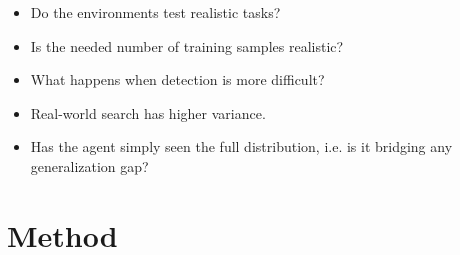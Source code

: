 \begin{itemize}
    \item Do the environments test realistic tasks?
    \item Is the needed number of training samples realistic?
    \item What happens when detection is more difficult?
    \item Real-world search has higher variance.
    \item Has the agent simply seen the full distribution, i.e. is it bridging any generalization gap?
\end{itemize}

\section{Method}
\label{sec:discussion-method}

% 
% 
% 
% 
% 

